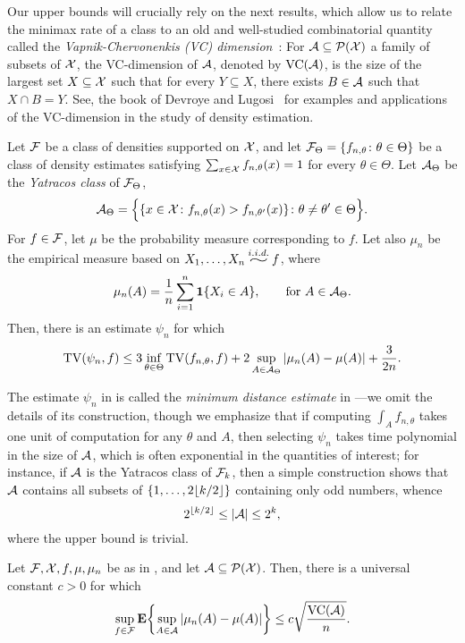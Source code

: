 Our upper bounds will crucially rely on the next results, which allow
us to relate the minimax rate of a class to an old and well-studied
combinatorial quantity called the \emph{Vapnik-Chervonenkis (VC)
  dimension}~\cite{vc}: For $\mathcal{A} \subseteq \mathcal{P}(\mathcal{X})$ a family of
subsets of $\mathcal{X}$, the VC-dimension of $\mathcal{A}$, denoted by $\operatorname{VC}(\mathcal{A})$, is
the size of the largest set $X \subseteq \mathcal{X}$ such that for every
$Y \subseteq X$, there exists $B \in \mathcal{A}$ such that $X \cap B =
Y$. See, \eg the book of Devroye and Lugosi~\cite{comb-methods} for
examples and applications of the VC-dimension in the study of density
estimation.

\begin{thm}
  Let $\mathcal{F}$ be a class of densities supported on $\mathcal{X}$, and let
  $\mathcal{F}_\Theta = \{f_{n, \theta} \colon \theta \in \Theta\}$ be a class
  of density estimates satisfying
  $\sum_{x \in \mathcal{X}} f_{n, \theta}(x) = 1$ for every
  $\theta \in \Theta$. Let $\mathcal{A}_\Theta$ be the \emph{Yatracos class}
  of $\mathcal{F}_\Theta$,
  \[
    \mathcal{A}_\Theta = \Big\{ \{ x \in \mathcal{X} \colon f_{n, \theta}(x) > f_{n, \theta'}(x)\} \colon \theta \neq \theta' \in \Theta \Big\} .
  \]
  For $f \in \mathcal{F}$, let $\mu$ be the probability measure corresponding
  to $f$. Let also $\mu_n$ be the empirical measure based on
  $X_1, \dots, X_n \iid f$, where
  \[
    \mu_n(A) = \frac{1}{n} \sum_{i = 1}^n \mathbf{1}\{X_i \in A\} ,
    \qquad \text{for $A \in \mathcal{A}_\Theta$}.
  \]
  Then, there is an estimate $\psi_n$ for which
  \[
    \operatorname{TV}(\psi_n, f) \le 3 \inf_{\theta \in \Theta} \operatorname{TV}(f_{n, \theta}, f) + 2 \sup_{A \in \mathcal{A}_\Theta} |\mu_n(A) - \mu(A)| +
    \frac{3}{2 n} .
  \]
\end{thm}

The estimate $\psi_n$ in  is called the
\emph{minimum distance estimate} in \cite{comb-methods}---we omit the
details of its construction, though we emphasize that if computing
$\int_A f_{n, \theta}$ takes one unit of computation for any $\theta$
and $A$, then selecting $\psi_n$ takes time polynomial in the size of
$\mathcal{A}$, which is often exponential in the quantities of interest; for
instance, if $\mathcal{A}$ is the Yatracos class of $\mathcal{F}_k$, then a simple
construction shows that $\mathcal{A}$ contains all subsets of
$\{1, \dots, 2 {\lfloor k/2 \rfloor} \}$ containing only odd numbers, whence
\[
  2^{{\lfloor k/2 \rfloor}} \le |\mathcal{A}| \le 2^k ,
\]
where the upper bound is trivial.

\begin{thm}
  Let $\mathcal{F}, \mathcal{X}, f, \mu, \mu_n$ be as in
  , and let $\mathcal{A} \subseteq
  \mathcal{P}(\mathcal{X})$. Then, there is a universal constant $c > 0$ for which
  \[
    \sup_{f \in \sF} \E\left\{ \sup_{A \in \sA} |\mu_n(A) - \mu(A)| \right\} \le c \sqrt{\frac{\VC(\sA)}{n}} .
  \]
\end{thm}


